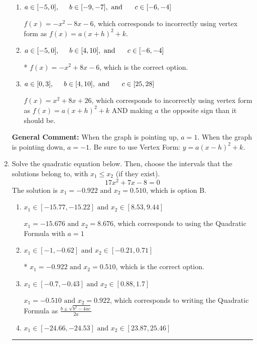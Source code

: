 \documentclass{extbook}[14pt]
\newcommand{\litem}[1]{\item #1

\rule{\textwidth}{0.4pt}}
\begin{document}
\begin{enumerate}
{\begin{enumerate}[label=\Alph*.]
$f(x)=x^{2} -8 x + 26$, which corresponds to making $a$ the opposite sign than it should be.
\item \( a \in [-5, 0], \hspace*{5mm} b \in [-9, -7], \text{ and } \hspace*{5mm} c \in [-6, -4] \)

$f(x)=-x^{2} -8 x -6$, which corresponds to incorrectly using vertex form as $f(x) = a(x+h)^2+k$.
\item \( a \in [-5, 0], \hspace*{5mm} b \in [4, 10], \text{ and } \hspace*{5mm} c \in [-6, -4] \)

* $f(x)=-x^{2} +8 x -6$, which is the correct option.
\item \( a \in [0, 3], \hspace*{5mm} b \in [4, 10], \text{ and } \hspace*{5mm} c \in [25, 28] \)

$f(x)=x^{2} +8 x + 26$, which corresponds to incorrectly using vertex form as $f(x) = a(x+h)^2+k$ AND making $a$ the opposite sign than it should be.
\end{enumerate}

\textbf{General Comment:} When the graph is pointing up, $a=1$. When the graph is pointing down, $a=-1$. Be sure to use Vertex Form: $y = a(x-h)^2+k$.
}
\litem{
Solve the quadratic equation below. Then, choose the intervals that the solutions belong to, with $x_1 \leq x_2$ (if they exist).
\[ 17x^{2} +7 x -8 = 0 \]The solution is \( x_1 = -0.922 \text{ and } x_2 = 0.510 \), which is option B.\begin{enumerate}[label=\Alph*.]
\item \( x_1 \in [-15.77, -15.22] \text{ and } x_2 \in [8.53, 9.44] \)

 $x_1 = -15.676 \text{ and } x_2 = 8.676$, which corresponds to using the Quadratic Formula with $a=1$
\item \( x_1 \in [-1, -0.62] \text{ and } x_2 \in [-0.21, 0.71] \)

* $x_1 = -0.922 \text{ and } x_2 = 0.510$, which is the correct option.
\item \( x_1 \in [-0.7, -0.43] \text{ and } x_2 \in [0.88, 1.7] \)

 $x_1 = -0.510 \text{ and } x_2 = 0.922$, which corresponds to writing the Quadratic Formula as $\frac{b \pm \sqrt{b^2 - 4ac}}{2a}$
\item \( x_1 \in [-24.66, -24.53] \text{ and } x_2 \in [23.87, 25.46] \)


\end{enumerate}}
\end{enumerate}
\end{document}
